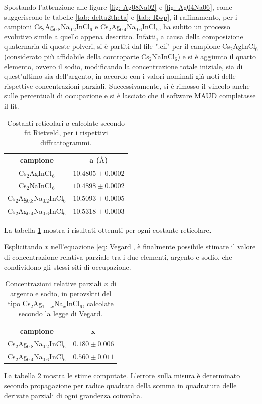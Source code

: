 \documentclass[a4paper,twocolumn,12 pt]{article}
\begin{document}
Spostando l'attenzione alle figure \ref{fig: Ag08Na02} e \ref{fig: Ag04Na06}, come suggeriscono le tabelle \ref{tab: delta2theta} e \ref{tab: Rwp}, il raffinamento, per i campioni Cs$_2$Ag$_{0.8}$Na$_{0.2}$InCl$_6$ e Cs$_2$Ag$_{0.4}$Na$_{0.6}$InCl$_6$, ha subito un processo evolutivo simile a quello appena descritto. Infatti, a causa della composizione quaternaria di queste polveri, si è partiti dal file ".cif" per il campione Cs$_2$AgInCl$_6$ (considerato più affidabile della controparte Cs$_2$NaInCl$_6$) e si è aggiunto il quarto elemento, ovvero il sodio, modificando la concentrazione totale iniziale, sia di quest'ultimo sia dell'argento, in accordo con i valori nominali già noti delle rispettive concentrazioni parziali. Successivamente, si è rimosso il vincolo anche sulle percentuali di occupazione e si è lasciato che il software MAUD completasse il fit.
\begin{center}
\begin{table}[htbp]\setlength\belowcaptionskip{-20pt}
    \centering
\begin{tabular}{cc}
    \hline
    \textbf{campione} & $\mathbf{a}$ ($\text{\AA}$) \\
    \hline
    Cs$_2$AgInCl$_6$ & $10.4805 \pm 0.0002$ \\
    Cs$_2$NaInCl$_6$ & $10.4898 \pm 0.0002$\\
    Cs$_2$Ag$_{0.8}$Na$_{0.2}$InCl$_6$ & $10.5093 \pm 0.0005$\\
    Cs$_2$Ag$_{0.4}$Na$_{0.6}$InCl$_6$ & $10.5318 \pm 0.0003$\\
    \hline
\end{tabular}
\caption{Costanti reticolari $a$ calcolate secondo fit Rietveld, per i rispettivi diffrattogrammi.}
\label{tab: a}
\end{table}
\end{center}
La tabella \ref{tab: a} mostra i risultati ottenuti per ogni costante reticolare.

Esplicitando $x$ nell'equazione \ref{eq: Vegard}, è finalmente possibile stimare il valore di concentrazione relativa parziale tra i due elementi, argento e sodio, che condividono gli stessi siti di occupazione.
\begin{center}
\begin{table}[htbp]\setlength\belowcaptionskip{-20pt}
    \centering
\begin{tabular}{cc}
    \hline
    \textbf{campione} & $\mathbf{x}$\\
    \hline
    Cs$_2$Ag$_{0.8}$Na$_{0.2}$InCl$_6$ & $0.180 \pm 0.006$\\
    Cs$_2$Ag$_{0.4}$Na$_{0.6}$InCl$_6$ & $0.560 \pm 0.011$\\
    \hline
\end{tabular}
\caption{Concentrazioni relative parziali $x$ di argento e sodio, in perovskiti del tipo Cs$_2$Ag$_{1-x}$Na$_{x}$InCl$_6$, calcolate secondo la legge di Vegard.}
\label{tab: x}
\end{table}
\end{center}
La tabella \ref{tab: x} mostra le stime computate. L'errore sulla misura è determinato secondo propagazione per radice quadrata della somma in quadratura delle derivate parziali di ogni grandezza coinvolta.
\end{document}

